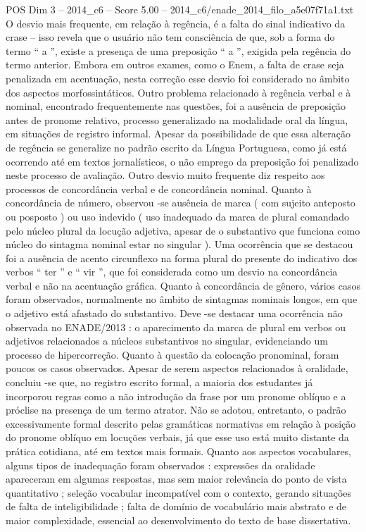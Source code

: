 \begin{textsample}{POS Dim 3 – 2014\_c6 – Score 5.00 – 2014\_c6/enade\_2014\_filo\_a5e07f71a1.txt}
O desvio mais frequente, em relação à regência, é a falta do sinal indicativo da crase – isso revela que o usuário não tem consciência de que, sob a forma do termo “ a ”, existe a presença de uma preposição “ a ”, exigida pela regência do termo anterior.
Embora em outros exames, como o Enem, a falta de crase seja penalizada em acentuação, nesta correção esse desvio foi considerado no âmbito dos aspectos morfossintáticos.
Outro problema relacionado à regência verbal e à nominal, encontrado frequentemente nas questões, foi a ausência de preposição antes de pronome relativo, processo generalizado na modalidade oral da língua, em situações de registro informal.
Apesar da possibilidade de que essa alteração de regência se generalize no padrão escrito da Língua Portuguesa, como já está ocorrendo até em textos jornalísticos, o não emprego da preposição foi penalizado neste processo de avaliação.
Outro desvio muito frequente diz respeito aos processos de concordância verbal e de concordância nominal.
Quanto à concordância de número, observou -se ausência de marca ( com sujeito anteposto ou posposto ) ou uso indevido ( uso inadequado da marca de plural comandado pelo núcleo plural da locução adjetiva, apesar de o substantivo que funciona como núcleo do sintagma nominal estar no singular ).
Uma ocorrência que se destacou foi a ausência de acento circunflexo na forma plural do presente do indicativo dos verbos “ ter ” e “ vir ”, que foi considerada como um desvio na concordância verbal e não na acentuação gráfica.
Quanto à concordância de gênero, vários casos foram observados, normalmente no âmbito de sintagmas nominais longos, em que o adjetivo está afastado do substantivo.
Deve -se destacar uma ocorrência não observada no ENADE/2013 : o aparecimento da marca de plural em verbos ou adjetivos relacionados a núcleos substantivos no singular, evidenciando um processo de hipercorreção.
Quanto à questão da colocação pronominal, foram poucos os casos observados.
Apesar de serem aspectos relacionados à oralidade, concluiu -se que, no registro escrito formal, a maioria dos estudantes já incorporou regras como a não introdução da frase por um pronome oblíquo e a próclise na presença de um termo atrator.
Não se adotou, entretanto, o padrão excessivamente formal descrito pelas gramáticas normativas em relação à posição do pronome oblíquo em locuções verbais, já que esse uso está muito distante da prática cotidiana, até em textos mais formais.
Quanto aos aspectos vocabulares, alguns tipos de inadequação foram observados : expressões da oralidade apareceram em algumas respostas, mas sem maior relevância do ponto de vista quantitativo ; seleção vocabular incompatível com o contexto, gerando situações de falta de inteligibilidade ; falta de domínio de vocabulário mais abstrato e de maior complexidade, essencial ao desenvolvimento do texto de base dissertativa.

\end{textsample}
